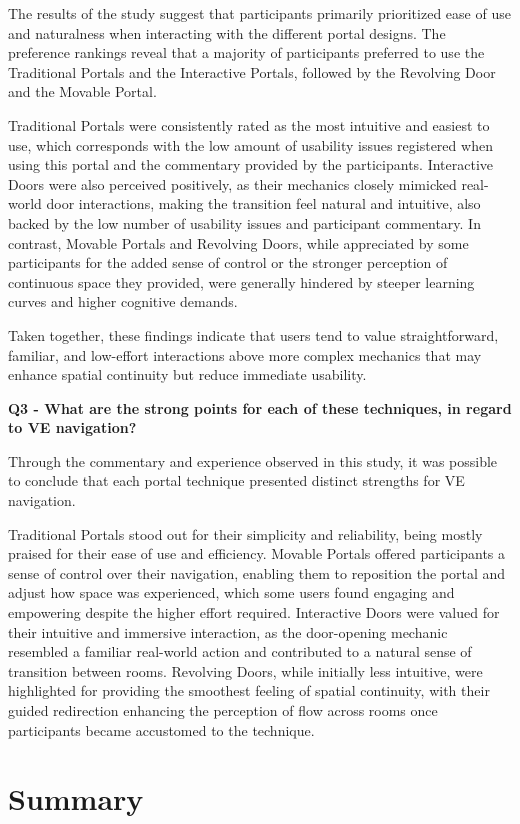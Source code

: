 The results of the study suggest that participants primarily prioritized ease of use and naturalness when interacting with the different 
portal designs. The preference rankings reveal that a majority of participants preferred to use the Traditional Portals and the 
Interactive Portals, followed by the Revolving Door and the Movable Portal.

Traditional Portals were consistently rated as the most intuitive and easiest to use, which corresponds with the low amount of usability 
issues registered when using this portal and the commentary provided by the participants. Interactive Doors were also perceived 
positively, as their mechanics closely mimicked real-world door interactions, making the transition feel natural and intuitive, also 
backed by the low number of usability issues and participant commentary. 
In contrast, Movable Portals and Revolving Doors, while appreciated by some participants for the added sense of control or the stronger 
perception of continuous space they provided, were generally hindered by steeper learning curves and higher cognitive demands. 

Taken together, these findings indicate that users tend to value straightforward, familiar, and low-effort interactions above more complex 
mechanics that may enhance spatial continuity but reduce immediate usability. 


\textbf{Q3 - What are the strong points for each of these techniques, in regard to \gls{VE} navigation?} 

Through the commentary and experience observed in this study, it was possible to conclude that each portal technique 
presented distinct strengths for \gls{VE} navigation. 

Traditional Portals stood out for their simplicity and reliability, being mostly praised for their ease of use and efficiency. 
Movable Portals offered participants a sense of control over their navigation, enabling them to reposition the portal and adjust 
how space was experienced, which some users found engaging and empowering despite the higher effort required. 
Interactive Doors were valued for their intuitive and immersive interaction, as the door-opening mechanic resembled a 
familiar real-world action and contributed to a natural sense of transition between rooms. 
Revolving Doors, while initially less intuitive, were highlighted for providing the smoothest feeling of spatial continuity, 
with their guided redirection enhancing the perception of flow across rooms once participants became accustomed to the technique.

\section{Summary}
\label{sec:summary}



